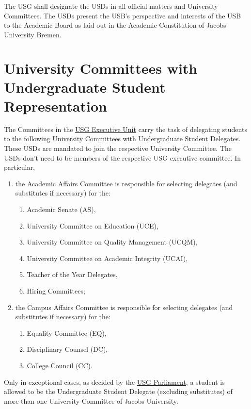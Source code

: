 
The USG shall designate the \protect\acp{USD} in all official matters and University Committees. The USDs present the USB's perspective and interests of the USB to the Academic Board as laid out in the Academic Constitution of Jacobs University Bremen. 

\section{University Committees with Undergraduate Student Representation}
The Committees in the \hyperref[USGexecutiveUnitDef]{USG Executive Unit} carry the task of delegating students to the following University Committees with Undergraduate Student Delegates. These USDs are mandated to join the respective University Committee. The USDs don't need to be members of the respective USG executive committee. In particular,
\begin{enumerate}
\item the Academic Affairs Committee is responsible for selecting delegates (and substitutes if necessary) for the:
\begin{enumerate}
    \item Academic Senate (AS),
    \item University Committee on Education (UCE),
    \item University Committee on Quality Management (UCQM),
    \protect\item University Committee on Academic Integrity (UCAI),
    \item Teacher of the Year Delegates,
    \item Hiring Committees;
\end{enumerate}
\item the Campus Affairs Committee is responsible for selecting delegates (and substitutes if necessary) for the:
\begin{enumerate}
    \item Equality Committee (EQ),
    \item Disciplinary Counsel (DC),
    \item College Council (CC).
\end{enumerate}
\end{enumerate}
Only in exceptional cases, as decided by the \protect\hyperref[USGParliamentDef]{USG Parliament}, a student is allowed to be the Undergraduate Student Delegate (excluding substitutes) of more than one University Committee of Jacobs University.

